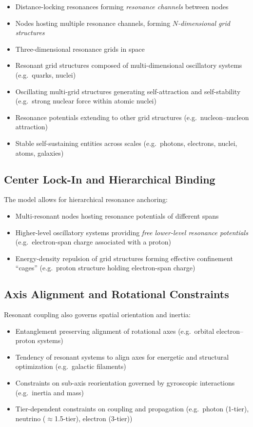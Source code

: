 \documentclass[11pt,a4paper]{article}
\begin{document}
\begin{itemize}
  \item Distance-locking resonances forming \emph{resonance channels} between nodes
  \item Nodes hosting multiple resonance channels, forming \emph{$N$-dimensional grid structures}
  \item Three-dimensional resonance grids in space
  \item Resonant grid structures composed of multi-dimensional oscillatory systems (e.g.\ quarks, nuclei)
  \item Oscillating multi-grid structures generating self-attraction and self-stability (e.g.\ strong nuclear force within atomic nuclei)
  \item Resonance potentials extending to other grid structures (e.g.\ nucleon--nucleon attraction)
  \item Stable self-sustaining entities across scales (e.g.\ photons, electrons, nuclei, atoms, galaxies)
\end{itemize}

\subsection{Center Lock-In and Hierarchical Binding}

The model allows for hierarchical resonance anchoring:

\begin{itemize}
  \item Multi-resonant nodes hosting resonance potentials of different spans
  \item Higher-level oscillatory systems providing \emph{free lower-level resonance potentials} (e.g.\ electron-span charge associated with a proton)
  \item Energy-density repulsion of grid structures forming effective confinement ``cages'' (e.g.\ proton structure holding electron-span charge)
\end{itemize}

\subsection{Axis Alignment and Rotational Constraints}

Resonant coupling also governs spatial orientation and inertia:

\begin{itemize}
  \item Entanglement preserving alignment of rotational axes (e.g.\ orbital electron--proton systems)
  \item Tendency of resonant systems to align axes for energetic and structural optimization (e.g.\ galactic filaments)
  \item Constraints on sub-axis reorientation governed by gyroscopic interactions (e.g.\ inertia and mass)
  \item Tier-dependent constraints on coupling and propagation (e.g.\ photon (1-tier), neutrino ($\approx$1.5-tier), electron (3-tier))
\end{itemize}
\end{document}
